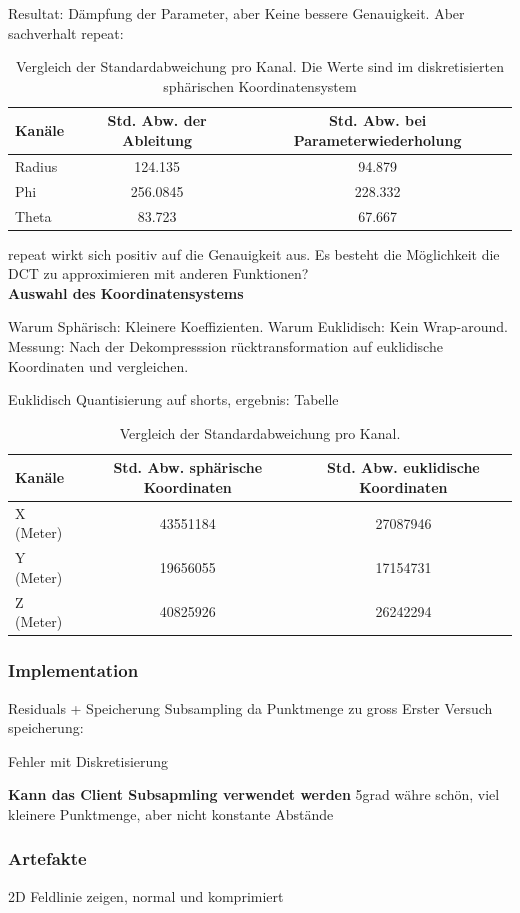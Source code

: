 Resultat: Dämpfung der Parameter, aber
Keine bessere Genauigkeit.
Aber sachverhalt repeat:
\begin{table}[!htbp]
\center
	\begin{tabular}{l|c|c}
	 Kanäle & Std. Abw. der Ableitung &  Std. Abw. bei Parameterwiederholung\\\hline
	 Radius & 124.135 & 94.879\\
	 Phi & 256.0845 & 228.332\\
	 Theta &  83.723 & 67.667\\
	\end{tabular}
	\caption{Vergleich der Standardabweichung pro Kanal. Die Werte sind im diskretisierten sphärischen Koordinatensystem}
	\label{resultate:loesung1:poc:repeat_tabelle}
\end{table}

repeat wirkt sich positiv auf die Genauigkeit aus. Es besteht die Möglichkeit die DCT zu approximieren mit anderen Funktionen?\\
[\baselineskip]
\textbf{Auswahl des Koordinatensystems}

Warum Sphärisch: Kleinere Koeffizienten.
Warum Euklidisch: Kein Wrap-around.
Messung: Nach der Dekompresssion rücktransformation auf euklidische Koordinaten und vergleichen.

Euklidisch Quantisierung auf shorts, ergebnis: Tabelle
\begin{table}[!htbp]
\center
	\begin{tabular}{l|c|c}
	 Kanäle & Std. Abw. sphärische Koordinaten &  Std. Abw. euklidische Koordinaten\\\hline
	 X (Meter) & 43551184 & 27087946\\
	 Y (Meter) & 19656055 & 17154731\\
	 Z (Meter) & 40825926 & 26242294\\
	\end{tabular}
	\caption{Vergleich der Standardabweichung pro Kanal.}
	\label{resultate:loesung1:poc:koordinatensysteme}
\end{table}

\subsubsection{Implementation}
Residuals + Speicherung
Subsampling da Punktmenge zu gross
Erster Versuch speicherung:





Fehler mit Diskretisierung

\textbf{Kann das Client Subsapmling verwendet werden}
5grad währe schön, viel kleinere Punktmenge, aber nicht konstante Abstände

\subsubsection{Artefakte}
2D Feldlinie zeigen, normal und komprimiert
